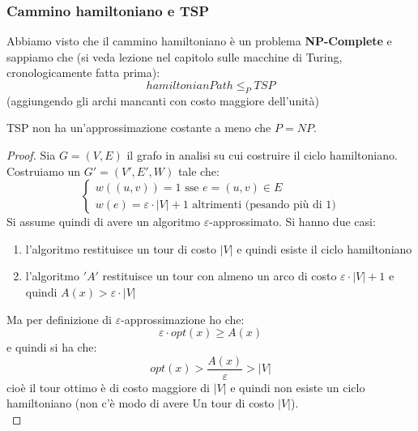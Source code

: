 																		      	\subsubsection{Cammino hamiltoniano e TSP}
												      	Abbiamo visto che il cammino hamiltoniano è un problema \textbf{NP-Complete} e
												      	sappiamo che (si veda lezione nel capitolo sulle macchine di Turing,
												      	cronologicamente fatta prima):
												      	\[hamiltonianPath\leq_P TSP\]
												      	(aggiungendo gli archi mancanti con costo maggiore dell'unità)
												      	\begin{definizione}
												      		TSP non ha un'approssimazione costante a meno che $P=NP$.
												      	\end{definizione}
												      	\begin{proof}
												      		Sia $G=(V,E)$ il grafo in analisi su cui costruire il ciclo hamiltoniano.
												      		Costruiamo un
												      		$G'=(V', E', W)$ tale che:
												      		\[
												      			\begin{cases}
												      				w((u,v)) = 1\mbox{ sse } e=(u,v) \in E  \\                          
												      				w(e)=\varepsilon\cdot|V|+1 \mbox{ altrimenti (pesando più di 1)} 
												      			\end{cases}
												      		\]
												      		Si assume quindi  di avere un algoritmo $\varepsilon$-approssimato.
												      		Si hanno due casi:
												      		\begin{enumerate}
												      			\item l'algoritmo restituisce un tour di costo $|V|$ e quindi esiste il
												      			      ciclo hamiltoniano
												      			\item l'algoritmo $ 'A' $ restituisce un tour con almeno un arco di costo
												      			      $\varepsilon\cdot|V|+1$ e quindi $A(x)>\varepsilon\cdot |V|$
												      		\end{enumerate}
												      		Ma per definizione di $\varepsilon$-approssimazione ho che:
												      		\[\varepsilon\cdot opt(x)\geq A(x)\]
												      		e quindi si ha che:
												      		\[opt(x)>\frac{A(x)}{\varepsilon}>|V|\]
												      		cioè il tour ottimo è di costo maggiore di $|V|$ e quindi non esiste un ciclo
												      		hamiltoniano (non c’è modo di avere Un tour di costo $|V|$).\\

\end{proof}
